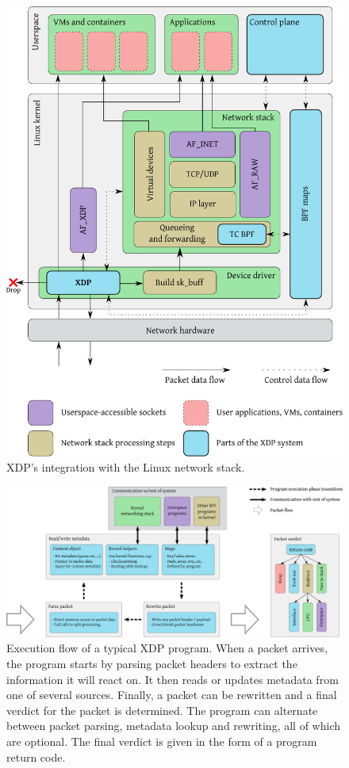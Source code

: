 \documentclass[sigconf]{acmart}
\begin{document}
\begin{figure}[t]
\centering
\includegraphics[width=\linewidth]{figures/kernel-diagram.pdf}
\caption{\label{fig:xdp-kernel} XDP's integration with the Linux network stack.}
\end{figure}

\begin{figure}[t]
\centering
\includegraphics[width=\linewidth]{figures/xdp-execution-diagram.pdf}
\caption{\label{fig:xdp-execution} Execution flow of a typical XDP program. When
  a packet arrives, the program starts by parsing packet headers to extract the
  information it will react on. It then reads or updates metadata from one of
  several sources. Finally, a packet can be rewritten and a final verdict for
  the packet is determined. The program can alternate between packet parsing,
  metadata lookup and rewriting, all of which are optional. The final verdict is
  given in the form of a program return code.}
\end{figure}
\end{document}
